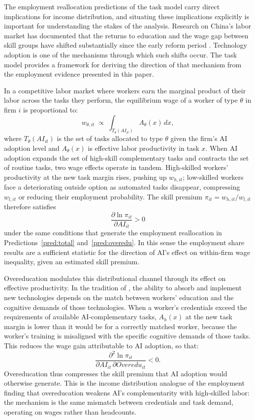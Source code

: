 \documentclass[12pt,a4paper]{article}
\theoremstyle{predstyle}
\theoremstyle{plain}
\newcommand{\Overedu}{\mathit{Overedu}}
\begin{document}
The employment reallocation predictions of the task model carry direct implications for income distribution, and situating these implications explicitly is important for understanding the stakes of the analysis. Research on China's labor market has documented that the returns to education and the wage gap between skill groups have shifted substantially since the early reform period \citep{knight2003, knight2014}. Technology adoption is one of the mechanisms through which such shifts occur. The task model provides a framework for deriving the direction of that mechanism from the employment evidence presented in this paper.

In a competitive labor market where workers earn the marginal product of their labor across the tasks they perform, the equilibrium wage of a worker of type $\theta$ in firm $i$ is proportional to:
\[
w_{\theta,it} \;\propto\; \int_{T_\theta(AI_{it})} A_\theta(x)\, dx,
\]
where $T_\theta(AI_{it})$ is the set of tasks allocated to type $\theta$ given the firm's AI adoption level and $A_\theta(x)$ is effective labor productivity in task $x$. When AI adoption expands the set of high-skill complementary tasks and contracts the set of routine tasks, two wage effects operate in tandem. High-skilled workers' productivity at the new task margin rises, pushing up $w_{h,it}$; low-skilled workers face a deteriorating outside option as automated tasks disappear, compressing $w_{l,it}$ or reducing their employment probability. The skill premium $\pi_{it} = w_{h,it}/w_{l,it}$ therefore satisfies
\[
\frac{\partial \ln \pi_{it}}{\partial AI_{it}} > 0
\]
under the same conditions that generate the employment reallocation in Predictions~\ref{pred:total} and~\ref{pred:overedu}. In this sense the employment share results are a sufficient statistic for the direction of AI's effect on within-firm wage inequality, given an estimated skill premium.

Overeducation modulates this distributional channel through its effect on effective productivity. In the tradition of \citet{nelson1966investment}, the ability to absorb and implement new technologies depends on the match between workers' education and the cognitive demands of those technologies. When a worker's credentials exceed the requirements of available AI-complementary tasks, $A_h(x)$ at the new task margin is lower than it would be for a correctly matched worker, because the worker's training is misaligned with the specific cognitive demands of those tasks. This reduces the wage gain attributable to AI adoption, so that:
\[
\frac{\partial^2 \ln \pi_{it}}{\partial AI_{it}\, \partial \Overedu_{it}} < 0.
\]
Overeducation thus compresses the skill premium that AI adoption would otherwise generate. This is the income distribution analogue of the employment finding that overeducation weakens AI's complementarity with high-skilled labor: the mechanism is the same mismatch between credentials and task demand, operating on wages rather than headcounts.
\end{document}
